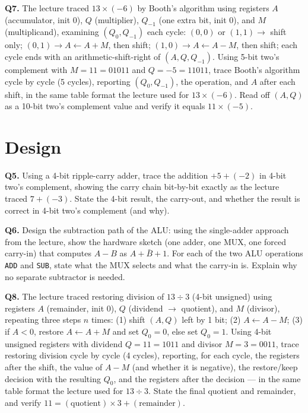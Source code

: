 \documentclass[11pt]{article}
\begin{document}
\textbf{Q7.} The lecture traced $13\times(-6)$ by Booth's algorithm using registers $A$ (accumulator, init $0$), $Q$ (multiplier), $Q_{-1}$ (one extra bit, init $0$), and $M$ (multiplicand), examining $(Q_0,Q_{-1})$ each cycle: $(0,0)$ or $(1,1)\to$ shift only; $(0,1)\to A\gets A+M$, then shift; $(1,0)\to A\gets A-M$, then shift; each cycle ends with an arithmetic-shift-right of $(A,Q,Q_{-1})$. Using 5-bit two's complement with $M=11=01011$ and $Q=-5=11011$, trace Booth's algorithm cycle by cycle (5 cycles), reporting $(Q_0,Q_{-1})$, the operation, and $A$ after each shift, in the same table format the lecture used for $13\times(-6)$. Read off $(A,Q)$ as a 10-bit two's complement value and verify it equals $11\times(-5)$.

\section{Design}

\textbf{Q5.} Using a 4-bit ripple-carry adder, trace the addition $+5 + (-2)$ in 4-bit two's complement, showing the carry chain bit-by-bit exactly as the lecture traced $7 + (-3)$. State the 4-bit result, the carry-out, and whether the result is correct in 4-bit two's complement (and why).

\textbf{Q6.} Design the subtraction path of the ALU: using the single-adder approach from the lecture, show the hardware sketch (one adder, one MUX, one forced carry-in) that computes $A - B$ as $A + \bar B + 1$. For each of the two ALU operations \texttt{ADD} and \texttt{SUB}, state what the MUX selects and what the carry-in is. Explain why no separate subtractor is needed.

\textbf{Q8.} The lecture traced restoring division of $13\div3$ (4-bit unsigned) using registers $A$ (remainder, init $0$), $Q$ (dividend $\to$ quotient), and $M$ (divisor), repeating three steps $n$ times: (1) shift $(A,Q)$ left by 1 bit; (2) $A\gets A-M$; (3) if $A<0$, restore $A\gets A+M$ and set $Q_0=0$, else set $Q_0=1$. Using 4-bit unsigned registers with dividend $Q=11=1011$ and divisor $M=3=0011$, trace restoring division cycle by cycle (4 cycles), reporting, for each cycle, the registers after the shift, the value of $A-M$ (and whether it is negative), the restore/keep decision with the resulting $Q_0$, and the registers after the decision --- in the same table format the lecture used for $13\div3$. State the final quotient and remainder, and verify $11 = (\text{quotient})\times 3 + (\text{remainder})$.
\end{document}
